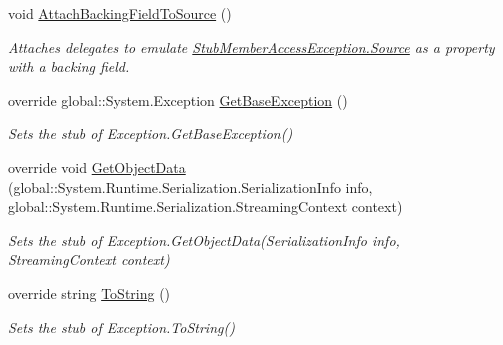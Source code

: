 \begin{DoxyCompactItemize}
void \hyperlink{class_system_1_1_fakes_1_1_stub_member_access_exception_a78c15e4039b8b8844daeaa8da7739c16}{Attach\-Backing\-Field\-To\-Source} ()
\begin{DoxyCompactList}\small\item\em Attaches delegates to emulate \hyperlink{class_system_1_1_fakes_1_1_stub_member_access_exception_abbeae94f648dd81825c04bc9637a68b6}{Stub\-Member\-Access\-Exception.\-Source} as a property with a backing field.\end{DoxyCompactList}\item 
override global\-::\-System.\-Exception \hyperlink{class_system_1_1_fakes_1_1_stub_member_access_exception_acb5798bf56b953f416779eecf9ae4d0a}{Get\-Base\-Exception} ()
\begin{DoxyCompactList}\small\item\em Sets the stub of Exception.\-Get\-Base\-Exception()\end{DoxyCompactList}\item 
override void \hyperlink{class_system_1_1_fakes_1_1_stub_member_access_exception_ad41033738d91b5c7ca28e53ce958ff2c}{Get\-Object\-Data} (global\-::\-System.\-Runtime.\-Serialization.\-Serialization\-Info info, global\-::\-System.\-Runtime.\-Serialization.\-Streaming\-Context context)
\begin{DoxyCompactList}\small\item\em Sets the stub of Exception.\-Get\-Object\-Data(\-Serialization\-Info info, Streaming\-Context context)\end{DoxyCompactList}\item 
override string \hyperlink{class_system_1_1_fakes_1_1_stub_member_access_exception_add7a26af35f3ce49dd56f20891b0e7c4}{To\-String} ()
\begin{DoxyCompactList}\small\item\em Sets the stub of Exception.\-To\-String()\end{DoxyCompactList}\end{DoxyCompactItemize}

